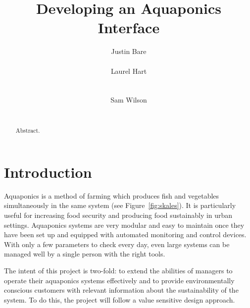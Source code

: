 \documentclass{sigchi}
\begin{document}
\title{Developing an Aquaponics Interface}

\author{
  \alignauthor Justin Bare\\
    \\
  \alignauthor Laurel Hart\\
    \\
    \\
  \alignauthor Sam Wilson\\
    \\
}

\maketitle

\begin{abstract}
Abstract.
\end{abstract}



\section{Introduction}

Aquaponics is a method of farming which produces fish and vegetables simultaneously in the same system (see Figure~\ref{fig:skales}). It is particularly useful for increasing food security and producing food sustainably in urban settings. Aquaponics systems are very modular and easy to maintain once they have been set up and equipped with automated monitoring and control devices. With only a few parameters to check every day, even large systems can be managed well by a single person with the right tools. 

The intent of this project is two-fold: to extend the abilities of managers to operate their aquaponics systems effectively and to provide environmentally conscious customers with relevant information about the sustainability of the system. To do this, the project will follow a value sensitive design approach.
\end{document}
